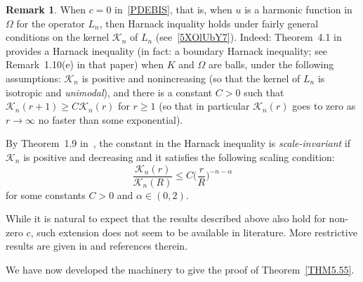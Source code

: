 \documentclass[a4paper,12pt,reqno]{amsart}
\numberwithin{equation}{section}
\theoremstyle{definition}
\newtheorem{remark}[theorem]{Remark}
\theoremstyle{notation}
\renewcommand{\le}{\leqslant}
\renewcommand{\ge}{\geqslant}
\newcommand{\jj}{{\mathcal{K}}}
\begin{document}
\begin{remark}
\label{rem:harnack}
When $c = 0$ in~\eqref{PDEBIS}, that is, when $u$ is a harmonic function in $\Omega$ for the operator $L_n$, then Harnack inquality holds under fairly general conditions on the kernel $\jj_n$ of $L_n$ (see~\eqref{5XOlUbY7}). Indeed: Theorem~4.1 in~\cite{GK18} provides a Harnack inequality (in fact: a boundary Harnack inequality; see Remark~1.10(e) in that paper) when $K$ and $\Omega$ are balls, under the following assumptions: $\jj_n$ is positive and nonincreasing (so that the kernel of $L_n$ is isotropic and \emph{unimodal}), and there is a constant $C > 0$ such that $\jj_n(r + 1) \ge C \jj_n(r)$ for $r \ge 1$ (so that in particular $\jj_n(r)$ goes to zero as $r \to \infty$ no faster than some exponential).


By Theorem~1.9 in~\cite{GK18}, the constant in the Harnack inequality is \emph{scale-invariant} if $\jj_n$ is positive and decreasing and it satisfies the following scaling condition:
\[ \frac{\jj_n(r)}{\jj_n(R)} \le C \biggl(\frac{r}{R}\biggr)^{-n - \alpha} \]
for some constants $C > 0$ and $\alpha \in (0, 2)$.


While it is natural to expect that the results described above also hold for non-zero $c$, such extension does not seem to be available in literature. More restrictive results are given in \cite{KIM2022125746,MR3794384,MR4023466} and references therein.
\end{remark}


We have now developed the machinery to give the proof of Theorem~\ref{THM5.55}.
\end{document}
